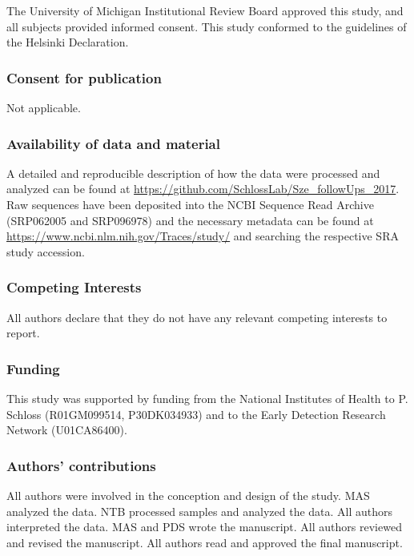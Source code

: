 \documentclass[12pt,]{article}
\begin{document}
The University of Michigan Institutional Review Board approved this
study, and all subjects provided informed consent. This study conformed
to the guidelines of the Helsinki Declaration.

\subsubsection{Consent for publication}\label{consent-for-publication}

Not applicable.

\subsubsection{Availability of data and
material}\label{availability-of-data-and-material}

A detailed and reproducible description of how the data were processed
and analyzed can be found at
\url{https://github.com/SchlossLab/Sze_followUps_2017}. Raw sequences
have been deposited into the NCBI Sequence Read Archive (SRP062005 and
SRP096978) and the necessary metadata can be found at
\url{https://www.ncbi.nlm.nih.gov/Traces/study/} and searching the
respective SRA study accession.

\subsubsection{Competing Interests}\label{competing-interests}

All authors declare that they do not have any relevant competing
interests to report.

\subsubsection{Funding}\label{funding}

This study was supported by funding from the National Institutes of
Health to P. Schloss (R01GM099514, P30DK034933) and to the Early
Detection Research Network (U01CA86400).

\subsubsection{Authors' contributions}\label{authors-contributions}

All authors were involved in the conception and design of the study. MAS
analyzed the data. NTB processed samples and analyzed the data. All
authors interpreted the data. MAS and PDS wrote the manuscript. All
authors reviewed and revised the manuscript. All authors read and
approved the final manuscript.
\end{document}
